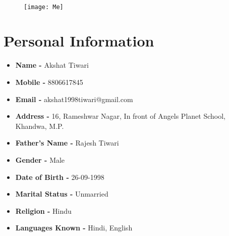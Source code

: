 \documentclass[a4paper]{scrartcl} %
\begin{document}
	
	\begin{center}	
		{\fontsize{36}{36}} \\%
		
		\vspace{1.5cm}
		
		\begin{figure}[htp]
			\texttt{[image: Me]}
		\end{figure}
		
		
		
		
		
		
		
		\section{Personal Information}
		
		\begin{itemize}
			\setlength\itemsep{0em}
			
			\item \noindent \textbf{Name - }Akshat Tiwari
			\item \noindent \textbf{Mobile - }8806617845
			\item \noindent\textbf{Email - }akshat1998tiwari@gmail.com
			\item \noindent\textbf{Address - }16, Rameshwar Nagar, In front of Angels Planet School, Khandwa, M.P.
			\item \noindent \textbf{Father's Name - }Rajesh Tiwari
			\item \noindent \textbf{Gender - }Male
			\item \noindent \textbf{Date of Birth - }26-09-1998
			\item \noindent \textbf{Marital Status - }Unmarried
			\item \noindent \textbf{Religion - }Hindu
			\item \noindent \textbf{Languages Known - }Hindi, English \\
		\end{itemize}
		

\end{center}
\end{document}
